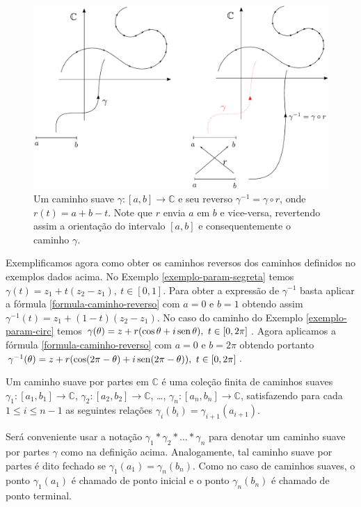 \begin{figure}[H]
\centering
\includegraphics[width=0.9\linewidth]{Figuras/fig-gamma-gamma-reverso}
\caption{Um caminho suave $\gamma:[a,b]\to\mathbb{C}$ e seu reverso $\gamma^{-1}= \gamma\circ r$, onde $r(t)=a+b-t$.
Note que $r$ envia $a$ em $b$ e vice-versa, revertendo assim a orientação do intervalo $[a,b]$ e 
consequentemente o caminho $\gamma$.}
\label{fig-gamma-gamma-reverso}
\end{figure}



Exemplificamos agora como obter os caminhos reversos dos caminhos definidos no exemplos dados
acima.
No Exemplo \ref{exemplo-param-segreta} temos $\gamma(t) = z_1+t(z_2-z_1),\ t\in[0,1]$. Para obter a
expressão de $\gamma^{-1}$ basta aplicar a fórmula \eqref{formula-caminho-reverso} com $a=0$ e $b=1$
obtendo assim $\gamma^{-1}(t) = z_1+(1-t)(z_2-z_1)$. 
No caso do caminho do Exemplo \ref{exemplo-param-circ} temos 
$\gamma(\theta) = z+r(\cos\theta+i\sen\theta),\ t\in[0,2\pi]$. Agora aplicamos a fórmula 
\eqref{formula-caminho-reverso} com $a=0$ e $b=2\pi$ obtendo portanto 
$\gamma^{-1}(\theta) = z+r(\cos(2\pi-\theta)+i\operatorname{sen}(2\pi-\theta)),\ t\in[0,2\pi]$.

\begin{definicao}
\label{def-caminho-suave-partes}
Um caminho suave por partes em $\mathbb{C}$ é uma coleção finita de caminhos suaves
$\gamma_{1}:[a_1,b_1]\to\mathbb{C}$, $\gamma_{2}:[a_2,b_2]\to\mathbb{C}$, \ldots, 
$\gamma_{n}:[a_n,b_n]\to\mathbb{C}$, satisfazendo para cada $1\leqslant i\leqslant n-1$
as seguintes relações $\gamma_{i}(b_i)=\gamma_{i+1}(a_{i+1})$.
\end{definicao}


Será conveniente usar a notação $\gamma_1*\gamma_2*\ldots*\gamma_n$ para denotar um caminho suave
por partes $\gamma$ como na definição acima. Analogamente, tal caminho suave por partes é dito
fechado se $\gamma_1(a_1)=\gamma_{n}(b_n)$. Como no caso de caminhos suaves, 
o ponto $\gamma_1(a_1)$ é chamado de ponto inicial e o ponto 
$\gamma_n(b_n)$ é chamado de ponto terminal. 


